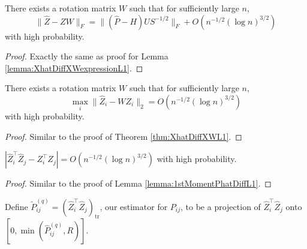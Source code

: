 \begin{lemma}
\label{lemma:XhatDiffXWexpression}
There exists a rotation matrix $W$ such that for sufficiently large $n$,
\[
	\|\hat{Z} - Z W\|_F = \| (\hat{P} - H) U S^{-1/2} \|_F + O(n^{-1/2} (\log n)^{3/2})
\]
with high probability.
\end{lemma}
\begin{proof}
Exactly the same as proof for Lemma \ref{lemma:XhatDiffXWexpressionL1}.
\end{proof}

\begin{theorem}
\label{thm:XhatDiffXW}
There exists a rotation matrix $W$ such that for sufficiently large $n$,
\[
	\max_i \| \hat{Z}_i - W Z_i \|_2 = O(n^{-1/2} (\log n)^{3/2})
\]
with high probability.
\end{theorem}
\begin{proof}
Similar to the proof of Theorem \ref{thm:XhatDiffXWL1}.
\end{proof}

\begin{lemma}
\label{lemma:1stMomentPhatDiffLq}
$\left|  \hat{Z}_i^{\top} \hat{Z}_j - Z_i^{\top} Z_j \right| = O(n^{-1/2} (\log n)^{3/2})$ with high probability.
\end{lemma}
\begin{proof}
Similar to the proof of Lemma \ref{lemma:1stMomentPhatDiffL1}.
\end{proof}

\begin{definition}
Define $\widetilde{P}_{ij}^{(q)} = (\hat{Z}_i^{\top} \hat{Z}_j)_{\mathrm{tr}}$, our estimator for $P_{ij}$, to be a projection of $\hat{Z}_i^{\top} \hat{Z}_j$ onto $[0, \min(\hat{P}_{ij}^{(q)}, R)]$.
\end{definition}

